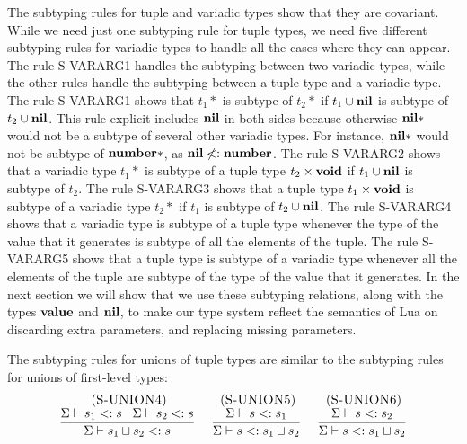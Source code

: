 The subtyping rules for tuple and variadic types show that they are covariant.
While we need just one subtyping rule for tuple types,
we need five different subtyping rules for variadic types
to handle all the cases where they can appear.
The rule \textsc{S-VARARG1} handles the subtyping between two variadic types,
while the other rules handle the subtyping between a tuple type and a variadic type.
The rule \textsc{S-VARARG1} shows that $t_{1}{*}$ is subtype of $t_{2}{*}$
if $t_{1} \cup \mathbf{nil}$ is subtype of $t_{2} \cup \mathbf{nil}$.
This rule explicit includes $\mathbf{nil}$ in both sides because otherwise
$\mathbf{nil}{*}$ would not be a subtype of several other variadic types.
For instance, $\mathbf{nil}{*}$ would not be subtype of $\mathbf{number}{*}$,
as $\mathbf{nil} \not<: \mathbf{number}$.
The rule \textsc{S-VARARG2} shows that a variadic type $t_{1}{*}$ is
subtype of a tuple type $t_{2} \times \mathbf{void}$ if $t_{1} \cup \mathbf{nil}$ is subtype of $t_{2}$.
The rule \textsc{S-VARARG3} shows that a tuple type $t_{1} \times \mathbf{void}$
is subtype of a variadic type $t_{2}{*}$ if $t_{1}$ is subtype of $t_{2} \cup \mathbf{nil}$.
The rule \textsc{S-VARARG4} shows that a variadic type is subtype of
a tuple type whenever the type of the value that it generates is
subtype of all the elements of the tuple.
The rule \textsc{S-VARARG5} shows that a tuple type is subtype of a
variadic type whenever all the elements of the tuple are subtype of
the type of the value that it generates.
In the next section we will show that we use these subtyping relations,
along with the types $\mathbf{value}$ and $\mathbf{nil}$, to make our type system reflect
the semantics of Lua on discarding extra parameters, and
replacing missing parameters.

The subtyping rules for unions of tuple types are similar to the
subtyping rules for unions of first-level types:
\[
\begin{array}{c}
\begin{array}{c}
\; (\textsc{S-UNION4})\\
\dfrac{\Sigma \vdash s_{1} <: s \;\;\;
       \Sigma \vdash s_{2} <: s}
      {\Sigma \vdash s_{1} \sqcup s_{2} <: s}
\end{array}
\;
\begin{array}{c}
\; (\textsc{S-UNION5})\\
\dfrac{\Sigma \vdash s <: s_{1}}
      {\Sigma \vdash s <: s_{1} \sqcup s_{2}}
\end{array}
\;
\begin{array}{c}
\; (\textsc{S-UNION6})\\
\dfrac{\Sigma \vdash s <: s_{2}}
      {\Sigma \vdash s <: s_{1} \sqcup s_{2}}
\end{array}
\end{array}
\]

